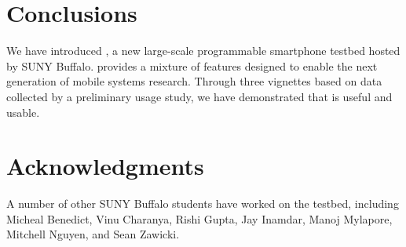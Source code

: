 \section{Conclusions}
\label{sec-conclusions}

We have introduced \PhoneLab{}, a new large-scale programmable smartphone
testbed hosted by SUNY Buffalo. \PhoneLab{} provides a mixture of features
designed to enable the next generation of mobile systems research. Through three
vignettes based on data collected by a preliminary usage study, we have
demonstrated that \PhoneLab{} is useful and usable.

\section*{Acknowledgments}

A number of other SUNY Buffalo students have worked on the \PhoneLab{} testbed,
including Micheal Benedict, Vinu Charanya, Rishi Gupta, Jay Inamdar, Manoj
Mylapore, Mitchell Nguyen, and Sean Zawicki.
